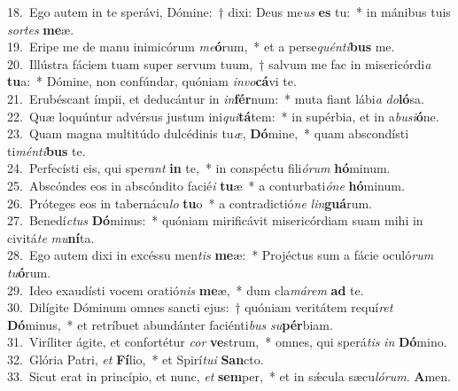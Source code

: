 {18.~}Ego autem in te sperávi, Dómine:~† dixi: Deus me\textit{us} \textbf{es} tu:~* in mánibus tuis \textit{sor}\textit{tes} \textbf{me}æ.\\
{19.~}Eripe me de manu inimicórum \textit{me}\textbf{ó}rum,~* et a perse\textit{quén}\textit{ti}\textbf{bus} me.\\
{20.~}Illústra fáciem tuam super servum tuum,~† salvum me fac in misericórdi\textit{a} \textbf{tu}a:~* Dómine, non confúndar, quóniam \textit{in}\textit{vo}\textbf{cá}vi te.\\
{21.~}Erubéscant ímpii, et deducántur in \textit{in}\textbf{fér}num:~* muta fiant lábi\textit{a} \textit{do}\textbf{ló}sa.\\
{22.~}Quæ loquúntur advérsus justum ini\textit{qui}\textbf{tá}tem:~* in supérbia, et in a\textit{bu}\textit{si}\textbf{ó}ne.\\
{23.~}Quam magna multitúdo dulcédinis tu\textit{æ}, \textbf{Dó}mine,~* quam abscondísti ti\textit{mén}\textit{ti}\textbf{bus} te.\\
{24.~}Perfecísti eis, qui spe\textit{rant} \textbf{in} te,~* in conspéctu fili\textit{ó}\textit{rum} \textbf{hó}minum.\\
{25.~}Abscóndes eos in abscóndito facié\textit{i} \textbf{tu}æ~* a conturbati\textit{ó}\textit{ne} \textbf{hó}minum.\\
{26.~}Próteges eos in tabernácu\textit{lo} \textbf{tu}o~* a contradictió\textit{ne} \textit{lin}\textbf{guá}rum.\\
{27.~}Benedí\textit{ctus} \textbf{Dó}minus:~* quóniam mirificávit misericórdiam suam mihi in civitá\textit{te} \textit{mu}\textbf{ní}ta.\\
{28.~}Ego autem dixi in excéssu men\textit{tis} \textbf{me}æ:~* Projéctus sum a fácie oculó\textit{rum} \textit{tu}\textbf{ó}rum.\\
{29.~}Ideo exaudísti vocem oratió\textit{nis} \textbf{me}æ,~* dum cla\textit{má}\textit{rem} \textbf{ad} te.\\
{30.~}Dilígite Dóminum omnes sancti ejus:~† quóniam veritátem requí\textit{ret} \textbf{Dó}minus,~* et retríbuet abundánter faciénti\textit{bus} \textit{su}\textbf{pér}biam.\\
{31.~}Viríliter ágite, et confortétur \textit{cor} \textbf{ve}strum,~* omnes, qui sperá\textit{tis} \textit{in} \textbf{Dó}mino.\\
{32.~}Glória Patri, \textit{et} \textbf{Fí}lio,~* et Spirí\textit{tu}\textit{i} \textbf{San}cto.\\
{33.~}Sicut erat in princípio, et nunc, \textit{et} \textbf{sem}per,~* et in sǽcula sæcu\textit{ló}\textit{rum}. \textbf{A}men.\\
